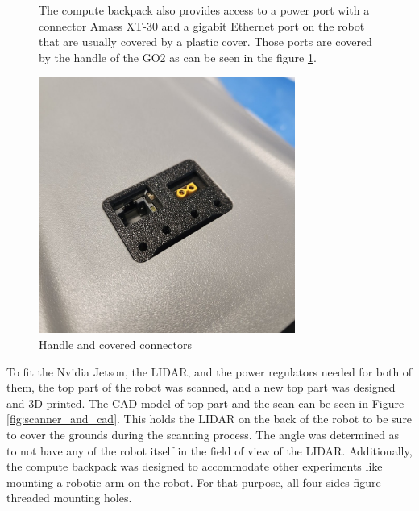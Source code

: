 \documentclass[11pt]{article}
\begin{document}
        \begin{figure}[H]
            \centering
            \begin{minipage}{0.45\textwidth}
                The compute backpack also provides access to a power port with a connector Amass XT-30 and a gigabit Ethernet port on the robot that are usually covered by a plastic cover. Those ports are covered by the handle of the GO2 as can be seen in the figure \ref{fig:handle_cover}.
            \end{minipage}%
            \hfill
            \begin{minipage}{0.5\textwidth}
                \centering
                \includegraphics[width=0.75\textwidth]{Images/PortsWithCover.jpg}
                \caption{Handle and covered connectors}
                \label{fig:handle_cover}
            \end{minipage}
        \end{figure}
        To fit the Nvidia Jetson, the LIDAR, and the power regulators needed for both of them, the top part of the robot was scanned, and a new top part was designed and 3D printed. The CAD model of top part and the scan can be seen in Figure \ref{fig:scanner_and_cad}. This holds the LIDAR on the back of the robot to be sure to cover the grounds during the scanning process. The angle was determined as to not have any of the robot itself in the field of view of the LIDAR. Additionally, the compute backpack was designed to accommodate other experiments like mounting a robotic arm on the robot. For that purpose, all four sides figure threaded mounting holes.
\end{document}
